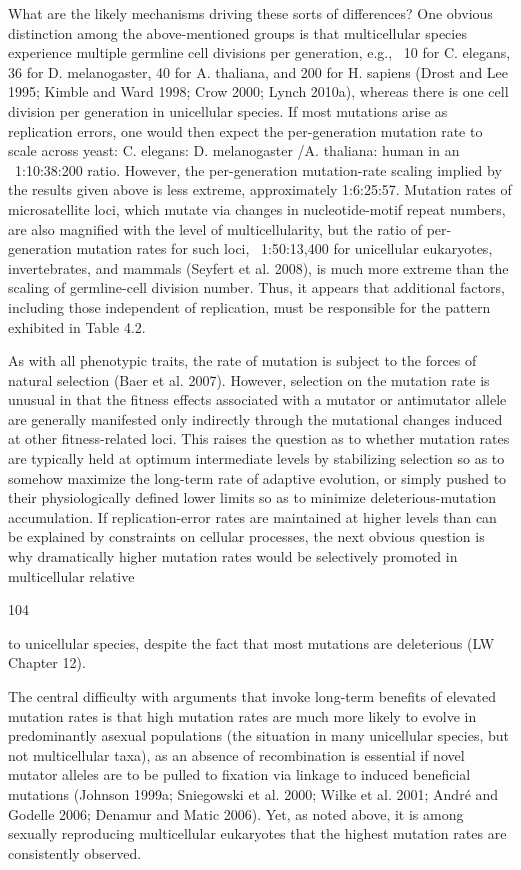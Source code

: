 \documentclass{article}
\begin{document}
What are the likely mechanisms driving these sorts of differences? One obvious distinction among the above-mentioned groups is that multicellular species experience multiple germline cell divisions per generation, e.g., ~10 for C. elegans, 36 for D. melanogaster, 40 for A. thaliana, and 200 for H. sapiens (Drost and Lee 1995; Kimble and Ward 1998; Crow 2000; Lynch 2010a), whereas there is one cell division per generation in unicellular species. If most mutations arise as replication errors, one would then expect the per-generation mutation rate to scale across yeast: C. elegans: D. melanogaster /A. thaliana: human in an ~1:10:38:200 ratio. However, the per-generation mutation-rate scaling implied by the results given above is less extreme, approximately 1:6:25:57. Mutation rates of microsatellite loci, which mutate via changes in nucleotide-motif repeat numbers, are also magnified with the level of multicellularity, but the ratio of per-generation mutation rates for such loci, ~1:50:13,400 for unicellular eukaryotes, invertebrates, and mammals (Seyfert et al. 2008), is much more extreme than the scaling of germline-cell division number. Thus, it appears that additional factors, including those independent of replication, must be responsible for the pattern exhibited in Table 4.2.

As with all phenotypic traits, the rate of mutation is subject to the forces of natural selection (Baer et al. 2007). However, selection on the mutation rate is unusual in that the fitness effects associated with a mutator or antimutator allele are generally manifested only indirectly through the mutational changes induced at other fitness-related loci. This raises the question as to whether mutation rates are typically held at optimum intermediate levels by stabilizing selection so as to somehow maximize the long-term rate of adaptive evolution, or simply pushed to their physiologically defined lower limits so as to minimize deleterious-mutation accumulation. If replication-error rates are maintained at higher levels than can be explained by constraints on cellular processes, the next obvious question is why dramatically higher mutation rates would be selectively promoted in multicellular relative

104

to unicellular species, despite the fact that most mutations are deleterious (LW Chapter 12).

The central difficulty with arguments that invoke long-term benefits of elevated mutation rates is that high mutation rates are much more likely to evolve in predominantly asexual populations (the situation in many unicellular species, but not multicellular taxa), as an absence of recombination is essential if novel mutator alleles are to be pulled to fixation via linkage to induced beneficial mutations (Johnson 1999a; Sniegowski et al. 2000; Wilke et al. 2001; André and Godelle 2006; Denamur and Matic 2006). Yet, as noted above, it is among sexually reproducing multicellular eukaryotes that the highest mutation rates are consistently observed.
\end{document}
